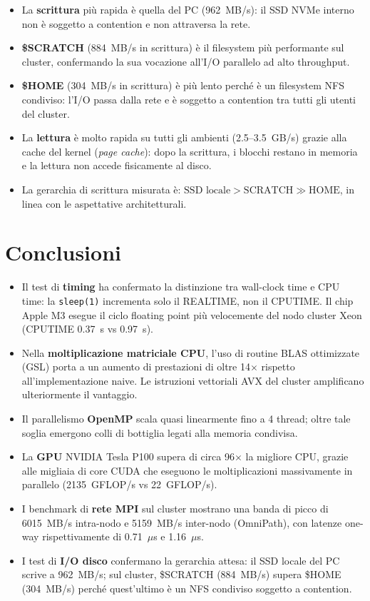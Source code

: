 \documentclass[a4paper,12pt]{article}
\begin{document}
\begin{itemize}
    \item La \textbf{scrittura} pi\`u rapida \`e quella del PC (962~MB/s): il SSD NVMe interno non \`e soggetto a contention e non attraversa la rete.
    \item \textbf{\$SCRATCH} (884~MB/s in scrittura) \`e il filesystem pi\`u performante sul cluster, confermando la sua vocazione all'I/O parallelo ad alto throughput.
    \item \textbf{\$HOME} (304~MB/s in scrittura) \`e pi\`u lento perch\'e \`e un filesystem NFS condiviso: l'I/O passa dalla rete e \`e soggetto a contention tra tutti gli utenti del cluster.
    \item La \textbf{lettura} \`e molto rapida su tutti gli ambienti (2.5--3.5~GB/s) grazie alla cache del kernel (\textit{page cache}): dopo la scrittura, i blocchi restano in memoria e la lettura non accede fisicamente al disco.
    \item La gerarchia di scrittura misurata \`e: $\text{SSD locale} > \text{SCRATCH} \gg \text{HOME}$, in linea con le aspettative architetturali.
\end{itemize}

\section{Conclusioni}

\begin{itemize}
    \item Il test di \textbf{timing} ha confermato la distinzione tra wall-clock time e CPU time: la \texttt{sleep(1)} incrementa solo il REALTIME, non il CPUTIME. Il chip Apple M3 esegue il ciclo floating point pi\`u velocemente del nodo cluster Xeon (CPUTIME 0.37~s vs 0.97~s).
    \item Nella \textbf{moltiplicazione matriciale CPU}, l'uso di routine BLAS ottimizzate (GSL) porta a un aumento di prestazioni di oltre 14$\times$ rispetto all'implementazione naive. Le istruzioni vettoriali AVX del cluster amplificano ulteriormente il vantaggio.
    \item Il parallelismo \textbf{OpenMP} scala quasi linearmente fino a 4 thread; oltre tale soglia emergono colli di bottiglia legati alla memoria condivisa.
    \item La \textbf{GPU} NVIDIA Tesla P100 supera di circa 96$\times$ la migliore CPU, grazie alle migliaia di core CUDA che eseguono le moltiplicazioni massivamente in parallelo (2135~GFLOP/s vs 22~GFLOP/s).
    \item I benchmark di \textbf{rete MPI} sul cluster mostrano una banda di picco di 6015~MB/s intra-nodo e 5159~MB/s inter-nodo (OmniPath), con latenze one-way rispettivamente di 0.71~$\mu$s e 1.16~$\mu$s.
    \item I test di \textbf{I/O disco} confermano la gerarchia attesa: il SSD locale del PC scrive a 962~MB/s; sul cluster, \$SCRATCH (884~MB/s) supera \$HOME (304~MB/s) perch\'e quest'ultimo \`e un NFS condiviso soggetto a contention.
\end{itemize}
\end{document}
